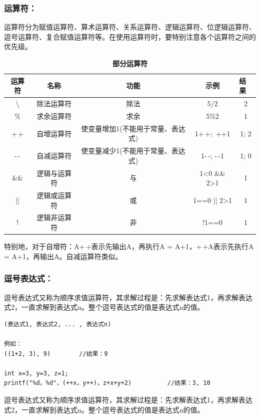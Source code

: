\documentclass[zihao=-4,UTF8]{report}
\begin{document}
\subsubsection{运算符：}
运算符分为赋值运算符、算术运算符、关系运算符、逻辑运算符、位逻辑运算符、逗号运算符、复合赋值运算符等。在使用运算符时，要特别注意各个运算符之间的优先级。
\begin{table}[H]
    \centering
    \caption{\textbf{部分运算符}}
    \begin{tabular}{ccccc} 
    \toprule
    运算符 & 名称     & 功能                 & 示例        & \multicolumn{1}{l}{结果}  \\
    \hline
    \textbackslash & 除法运算符  & 除法                 & 5/2       & 2      \\
    \%  & 求余运算符  & 求余                 & 5\%2      & 1      \\
    +\,+  & 自增运算符  & 使变量增加1(不能用于常量、表达式) & 1+\,+;\ ++1       & 1; 2      \\
    -\,-  & 自减运算符  & 使变量减少1(不能用于常量、表达式) & 1-\,-; -\,-1        &  1; 0       \\
    \&\&   & 逻辑与运算符 & 与                  & 1<0 \&\& 2>1      & 1      \\
    ||    & 逻辑或运算符 & 或                  & 1==0 || 2>1 & 1       \\
    !   & 逻辑非运算符 & 非                  & !1==0     & 1      \\
    \bottomrule
    \end{tabular}
\end{table}
特别地，对于自增符：A+\,+表示先输出A，再执行A = A+1，+\,+A表示先执行A = A+1，再输出A。自减运算符类似。
\subsubsection{逗号表达式：}
逗号表达式又称为顺序求值运算符，其求解过程是：先求解表达式1，再求解表达式2，一直求解到表达式n。整个逗号表达式的值是表达式n的值。
\begin{lstlisting}
(表达式1, 表达式2, ... , 表达式n)

例如：
((1+2, 3), 9)        //结果：9

int x=3, y=3, z=1;
printf("%d，%d"，(++x，y++)，z+x+y+2)          //结果：3, 10
\end{lstlisting}\par
逗号表达式又称为顺序求值运算符，其求解过程是：先求解表达式1，再求解表达式2，一直求解到表达式n。整个逗号表达式的值是表达式n的值。
\end{document}
